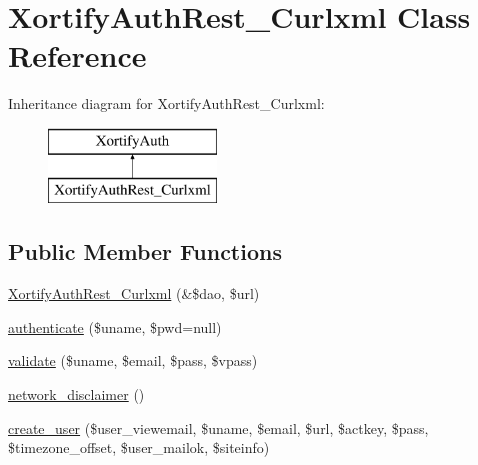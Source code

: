 \hypertarget{class_xortify_auth_rest___curlxml}{\section{Xortify\-Auth\-Rest\-\_\-\-Curlxml Class Reference}
\label{class_xortify_auth_rest___curlxml}
}
Inheritance diagram for Xortify\-Auth\-Rest\-\_\-\-Curlxml\-:\begin{figure}[H]
\begin{center}
\leavevmode
\includegraphics[height=2.000000cm]{class_xortify_auth_rest___curlxml}
\end{center}
\end{figure}
\subsection*{Public Member Functions}
\begin{DoxyCompactItemize}
\item 
\hyperlink{class_xortify_auth_rest___curlxml_a41877f191656ec90b29293add4a0a1b5}{Xortify\-Auth\-Rest\-\_\-\-Curlxml} (\&\$dao, \$url)
\item 
\hyperlink{class_xortify_auth_rest___curlxml_a33cdc16e7b31f79464c0a60b99946e00}{authenticate} (\$uname, \$pwd=null)
\item 
\hyperlink{class_xortify_auth_rest___curlxml_a079360a715f8ac2cecb6d8b7182bd4bb}{validate} (\$uname, \$email, \$pass, \$vpass)
\item 
\hyperlink{class_xortify_auth_rest___curlxml_a9aa37e5b95f4e6e405a2a3ba16fa2c5d}{network\-\_\-disclaimer} ()
\item 
\hyperlink{class_xortify_auth_rest___curlxml_a8287ce3b9ebccfde9019b948dc6ab55f}{create\-\_\-user} (\$user\-\_\-viewemail, \$uname, \$email, \$url, \$actkey, \$pass, \$timezone\-\_\-offset, \$user\-\_\-mailok, \$siteinfo)
\end{DoxyCompactItemize}
